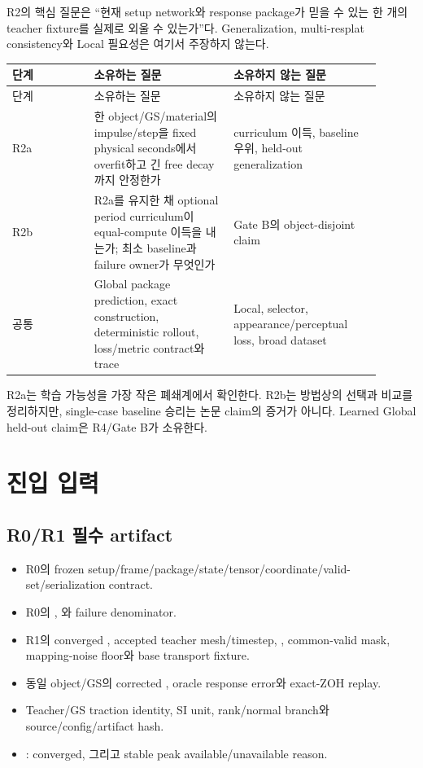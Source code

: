 \documentclass[10pt]{article}
\begin{document}
R2의 핵심 질문은 ``현재 setup network와 response package가 믿을 수 있는 한 개의 teacher fixture를
실제로 외울 수 있는가''다. Generalization, multi-resplat consistency와 Local 필요성은 여기서 주장하지 않는다.

\begin{longtable}{L{0.20\linewidth}L{0.34\linewidth}L{0.36\linewidth}}
\toprule
단계 & 소유하는 질문 & 소유하지 않는 질문\\
\midrule
\endfirsthead
\toprule
단계 & 소유하는 질문 & 소유하지 않는 질문\\
\midrule
\endhead
R2a & 한 object/GS/material의 impulse/step을 fixed physical seconds에서 overfit하고 긴 free decay까지 안정한가 & curriculum 이득, baseline 우위, held-out generalization\\
R2b & R2a를 유지한 채 optional period curriculum이 equal-compute 이득을 내는가; 최소 baseline과 failure owner가 무엇인가 & Gate B의 object-disjoint claim\\
공통 & Global package prediction, exact construction, deterministic rollout, loss/metric contract와 trace & Local, selector, appearance/perceptual loss, broad dataset\\
\bottomrule
\end{longtable}

R2a는 학습 가능성을 가장 작은 폐쇄계에서 확인한다. R2b는 방법상의 선택과 비교를 정리하지만,
single-case baseline 승리는 논문 claim의 증거가 아니다. Learned Global held-out claim은 R4/Gate B가 소유한다.

\section{진입 입력}
\label{sec:r2-chapter-2}

\subsection{R0/R1 필수 artifact}

\begin{itemize}
  \item R0의 frozen setup/frame/package/state/tensor/coordinate/valid-set/serialization contract.
  \item R0의 , 와 failure denominator.
  \item R1의 converged , accepted teacher mesh/timestep, ,
  common-valid mask, mapping-noise floor와 base transport fixture.
  \item 동일 object/GS의 corrected , oracle response error와 exact-ZOH replay.
  \item Teacher/GS traction identity, SI unit, rank/normal branch와 source/config/artifact hash.
  \item {}: converged, 그리고 stable peak available/unavailable reason.
\end{itemize}
\end{document}
